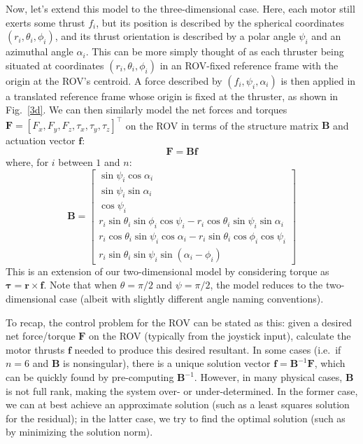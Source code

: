\documentclass{article}
\renewcommand{\vec}[1]{\mathbf{#1}}
\newcommand{\trans}[1]{#1^\intercal}
\newcommand{\inv}[1]{#1^{-1}}
\begin{document}
Now, let's extend this model to the three-dimensional case. Here, each motor still exerts some thrust $f_i$, but its position is described by the spherical coordinates $(r_i, \theta_i, \phi_i)$, and its thrust orientation is described by a polar angle $\psi_i$ and an azimuthal angle $\alpha_i$. This can be more simply thought of as each thruster being situated at coordinates $(r_i, \theta_i, \phi_i)$ in an ROV-fixed reference frame with the origin at the ROV's centroid. A force described by $(f_i, \psi_i, \alpha_i)$ is then applied in a translated reference frame whose origin is fixed at the thruster, as shown in Fig.~\ref{3d}. We can then similarly model the net forces and torques $\vec{F} = \trans{[F_x, F_y, F_z, \tau_x, \tau_y, \tau_z]}$ on the ROV in terms of the structure matrix $\vec{B}$ and actuation vector $\vec{f}$:
\begin{equation}
  \vec{F} = \vec{B}\vec{f}
\end{equation}
where, for $i$ between $1$ and $n$:
\begin{equation}
  \vec{B} =
  \begin{bmatrix}
    \sin\psi_i\cos\alpha_i \\
    \sin\psi_i\sin\alpha_i \\
    \cos\psi_i \\
    r_i\sin\theta_i\sin\phi_i\cos\psi_i - r_i\cos\theta_i\sin\psi_i\sin\alpha_i \\
    r_i\cos\theta_i\sin\psi_i\cos\alpha_i - r_i\sin\theta_i\cos\phi_i\cos\psi_i \\
    r_i\sin\theta_i\sin\psi_i\sin(\alpha_i-\phi_i)
  \end{bmatrix}
\end{equation}
This is an extension of our two-dimensional model by considering torque as $\vec{\tau} = \vec{r} \times \vec{f}$. Note that when $\theta = \pi/2$ and $\psi = \pi/2$, the model reduces to the two-dimensional case (albeit with slightly different angle naming conventions).

To recap, the control problem for the ROV can be stated as this: given a desired net force/torque $\vec{F}$ on the ROV (typically from the joystick input), calculate the motor thrusts $\vec{f}$ needed to produce this desired resultant. In some cases (i.e.\ if $n=6$ and $\vec{B}$ is nonsingular), there is a unique solution vector $\vec{f} = \inv{\vec{B}}\vec{F}$, which can be quickly found by pre-computing $\inv{\vec{B}}$. However, in many physical cases, $\vec{B}$ is not full rank, making the system over- or under-determined. In the former case, we can at best achieve an approximate solution (such as a least squares solution for the residual); in the latter case, we try to find the optimal solution (such as by minimizing the solution norm).
\end{document}

